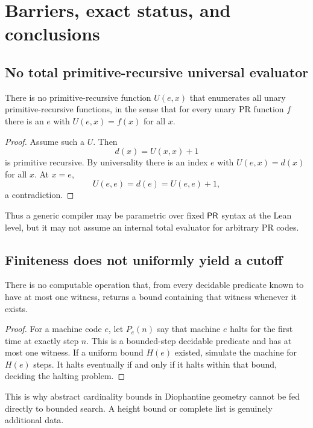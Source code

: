 \section{Barriers, exact status, and conclusions}
\label{sec:barriers}

\subsection{No total primitive-recursive universal evaluator}

\begin{proposition}
There is no primitive-recursive function \(U(e,x)\) that enumerates all unary
primitive-recursive functions, in the sense that for every unary PR function
\(f\) there is an \(e\) with \(U(e,x)=f(x)\) for all \(x\).
\end{proposition}

\begin{proof}
Assume such a \(U\).  Then
\[
       d(x)=U(x,x)+1
\]
is primitive recursive.  By universality there is an index \(e\) with
\(U(e,x)=d(x)\) for all \(x\).  At \(x=e\),
\[
       U(e,e)=d(e)=U(e,e)+1,
\]
a contradiction.
\end{proof}

Thus a generic compiler may be parametric over fixed \(\mathsf{PR}\) syntax at the
Lean level, but it may not assume an internal total evaluator for arbitrary PR
codes.

\subsection{Finiteness does not uniformly yield a cutoff}

\begin{proposition}
There is no computable operation that, from every decidable predicate known to
have at most one witness, returns a bound containing that witness whenever it
exists.
\end{proposition}

\begin{proof}
For a machine code \(e\), let \(P_e(n)\) say that machine \(e\) halts for the
first time at exactly step \(n\).  This is a bounded-step decidable predicate
and has at most one witness.  If a uniform bound \(H(e)\) existed, simulate the
machine for \(H(e)\) steps.  It halts eventually if and only if it halts within
that bound, deciding the halting problem.
\end{proof}

This is why abstract cardinality bounds in Diophantine geometry cannot be fed
directly to bounded search.  A height bound or complete list is genuinely
additional data.

